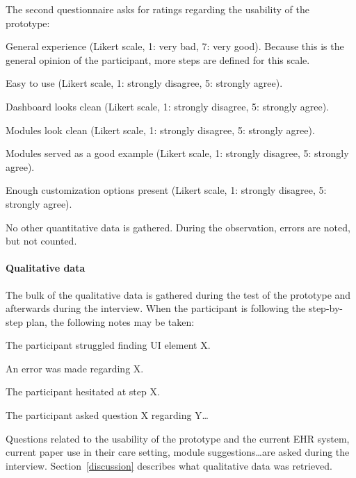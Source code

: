     \noindent The second questionnaire asks for ratings regarding the usability of the prototype: 
    \vspace{-6pt}
    \begin{myitemize}
        \item General experience (Likert scale, 1: very bad, 7: very good). Because this is the general opinion of the participant, more steps are defined for this scale.
        \item Easy to use (Likert scale, 1: strongly disagree, 5: strongly agree).
        \item Dashboard looks clean (Likert scale, 1: strongly disagree, 5: strongly agree).
        \item Modules look clean (Likert scale, 1: strongly disagree, 5: strongly agree).
        \item Modules served as a good example (Likert scale, 1: strongly disagree, 5: strongly agree).
        \item Enough customization options present (Likert scale, 1: strongly disagree, 5: strongly agree).
    \end{myitemize}

    \noindent No other quantitative data is gathered. During the observation, errors are noted, but not counted.

    \paragraph{Qualitative data} The bulk of the qualitative data is gathered during the test of the prototype and afterwards during the interview. When the participant is following the step-by-step plan, the following notes may be taken:
    \vspace{-6pt}
    \begin{myitemize}
        \item The participant struggled finding UI element X.
        \item An error was made regarding X.
        \item The participant hesitated at step X.
        \item The participant asked question X regarding Y\ldots
    \end{myitemize}

    \noindent Questions related to the usability of the prototype and the current EHR system, current paper use in their care setting, module suggestions\ldots are asked during the interview. Section~\ref{discussion} describes what qualitative data was retrieved.

